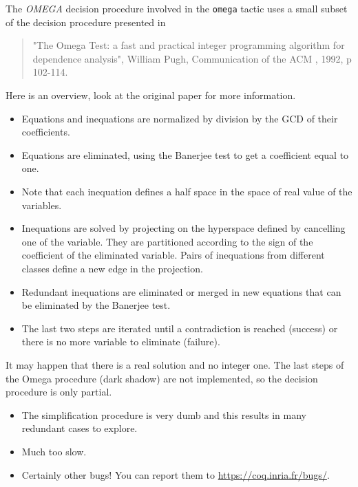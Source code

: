 
The {\it OMEGA} decision procedure involved in the {\tt omega} tactic uses
a small subset of the decision procedure presented in

\begin{quote}
  "The Omega Test: a fast and practical integer programming
algorithm for dependence analysis", William Pugh, Communication of the
ACM , 1992, p 102-114.
\end{quote}

Here is an overview, look at the original paper for more information.

\begin{itemize}

\item Equations and inequations are normalized by division by the GCD of their
     coefficients.
\item Equations are eliminated, using the Banerjee test to get a coefficient
     equal to one.
\item Note that each inequation defines a half space in the space of real value
     of the variables.
   \item Inequations are solved by projecting on the hyperspace
     defined by cancelling one of the variable.  They are partitioned
     according to the sign of the coefficient of the eliminated
     variable. Pairs of inequations from different classes define a
     new edge in the projection.
   \item Redundant inequations are eliminated or merged in new
     equations that can be eliminated by the Banerjee test.
\item The last two steps are iterated until a contradiction is reached
     (success) or there is no more variable to eliminate (failure).

\end{itemize}

It may happen that there is a real solution and no integer one. The last
steps of the Omega procedure (dark shadow) are not implemented, so the
decision procedure is only partial.


\begin{itemize}
\item The simplification procedure is very dumb and this results in
  many redundant cases to explore.

\item Much too slow.

\item Certainly other bugs! You can report them to \url{https://coq.inria.fr/bugs/}.

\end{itemize}

